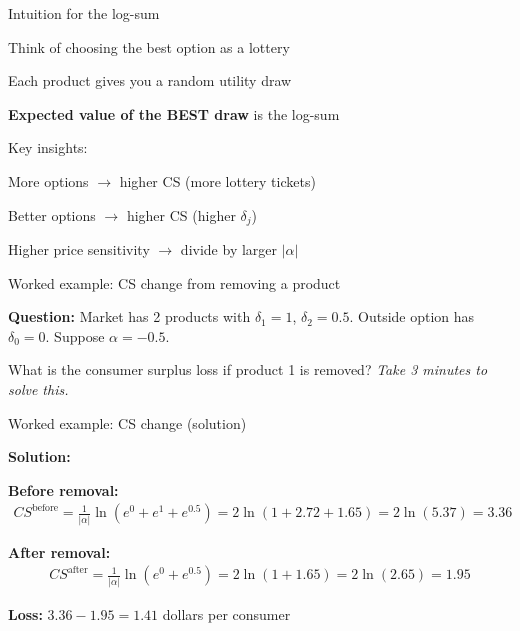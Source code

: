 \documentclass[notes,11pt, aspectratio=169]{beamer}
\newenvironment{wideitemize}{\itemize\addtolength{\itemsep}{10pt}}{\enditemize}
\begin{document}
\begin{frame}{Intuition for the log-sum}
	\begin{wideitemize}
		\item Think of choosing the best option as a lottery
		\item Each product gives you a random utility draw
		\item \textbf{Expected value of the BEST draw} is the log-sum
		\item Key insights:
		\begin{wideitemize}
			\vspace{5pt}
			\item More options $\rightarrow$ higher CS (more lottery tickets)
			\item Better options $\rightarrow$ higher CS (higher $\delta_j$)
			\item Higher price sensitivity $\rightarrow$ divide by larger $|\alpha|$
		\end{wideitemize}
	\end{wideitemize}
\end{frame}

\begin{frame}{Worked example: CS change from removing a product}
	\begin{wideitemize}
		\item \textbf{Question:} Market has 2 products with $\delta_1 = 1$, $\delta_2 = 0.5$. Outside option has $\delta_0 = 0$. Suppose $\alpha = -0.5$.
		\item What is the consumer surplus loss if product 1 is removed?
	\end{wideitemize}
	\vspace{15pt}
	\centering
	\textit{Take 3 minutes to solve this.}
\end{frame}

\begin{frame}{Worked example: CS change (solution)}
	\begin{wideitemize}
		\item \textbf{Solution:}
		\item \textbf{Before removal:}
		\begin{align*}
			CS^{\text{before}} = \frac{1}{|\alpha|} \ln(e^0 + e^1 + e^{0.5}) = 2 \ln(1 + 2.72 + 1.65) = 2 \ln(5.37) = 3.36
		\end{align*}
		\item \textbf{After removal:}
		\begin{align*}
			CS^{\text{after}} = \frac{1}{|\alpha|} \ln(e^0 + e^{0.5}) = 2 \ln(1 + 1.65) = 2 \ln(2.65) = 1.95
		\end{align*}
		\item \textbf{Loss:} $3.36 - 1.95 = 1.41$ dollars per consumer
	\end{wideitemize}
\end{frame}
\end{document}
